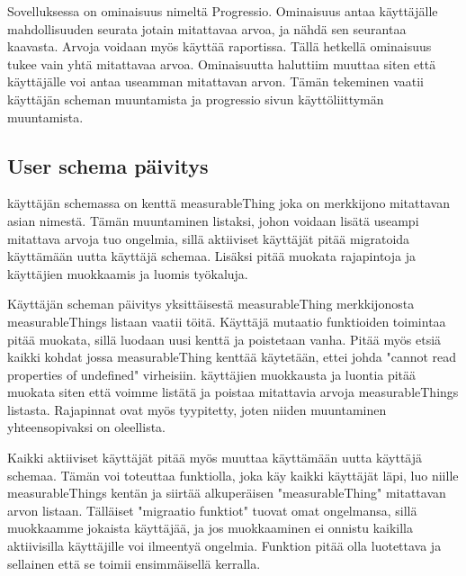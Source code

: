 



Sovelluksessa on ominaisuus nimeltä Progressio. Ominaisuus antaa käyttäjälle mahdollisuuden seurata jotain mitattavaa arvoa, ja nähdä sen seurantaa kaavasta.
Arvoja voidaan myös käyttää raportissa.
%
Tällä hetkellä ominaisuus tukee vain yhtä mitattavaa arvoa.
Ominaisuutta haluttiim muuttaa siten että käyttäjälle voi antaa useamman mitattavan arvon. 
Tämän tekeminen vaatii käyttäjän scheman muuntamista ja progressio sivun käyttöliittymän muuntamista.
\medskip






\subsection*{User schema päivitys}


käyttäjän schemassa on kenttä measurableThing joka on merkkijono mitattavan asian nimestä.
Tämän muuntaminen listaksi, johon voidaan lisätä useampi mitattava arvoja tuo ongelmia, sillä aktiiviset käyttäjät pitää migratoida käyttämään uutta käyttäjä schemaa. 
Lisäksi pitää muokata rajapintoja ja käyttäjien muokkaamis ja luomis työkaluja.
\medskip



Käyttäjän scheman päivitys yksittäisestä measurableThing merkkijonosta measurableThings listaan vaatii töitä.
Käyttäjä mutaatio funktioiden toimintaa pitää muokata, sillä luodaan uusi kenttä ja poistetaan vanha.
Pitää myös etsiä kaikki kohdat jossa measurableThing kenttää käytetään, ettei johda "cannot read properties of undefined"{} virheisiin.
käyttäjien muokkausta ja luontia pitää muokata siten että voimme listätä ja poistaa mitattavia arvoja measurableThings listasta.
Rajapinnat ovat myös tyypitetty, joten niiden muuntaminen yhteensopivaksi on oleellista.
\medskip


Kaikki aktiiviset käyttäjät pitää myös muuttaa käyttämään uutta käyttäjä schemaa.
Tämän voi toteuttaa funktiolla, joka käy kaikki käyttäjät läpi, luo niille measurableThings kentän ja siirtää alkuperäisen "measurableThing"{} mitattavan arvon listaan.
Tälläiset "migraatio funktiot"{} tuovat omat ongelmansa, sillä muokkaamme jokaista käyttäjää, ja jos muokkaaminen ei onnistu kaikilla aktiivisilla käyttäjille voi ilmeentyä ongelmia.
Funktion pitää olla luotettava ja sellainen että se toimii ensimmäisellä kerralla.
\medskip




